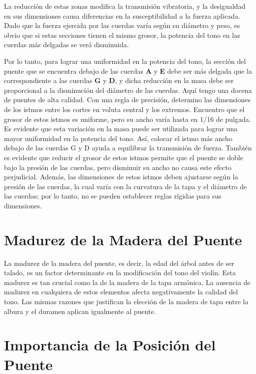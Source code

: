 \documentclass[12pt]{book}
\begin{document}
La reducción de estas zonas modifica la transmisión vibratoria, y la desigualdad en sus dimensiones causa diferencias en la susceptibilidad a la fuerza aplicada. Dado que la fuerza ejercida por las cuerdas varía según su diámetro y peso, es obvio que si estas secciones tienen el mismo grosor, la potencia del tono en las cuerdas más delgadas se verá disminuida. 

Por lo tanto, para lograr una uniformidad en la potencia del tono, la sección del puente que se encuentra debajo de las cuerdas \textbf{A} y \textbf{E} debe ser más delgada que la correspondiente a las cuerdas \textbf{G} y \textbf{D}, y dicha reducción en la masa debe ser proporcional a la disminución del diámetro de las cuerdas.
Aquí tengo una docena de puentes de alta calidad. Con una regla de precisión, determino las dimensiones de los istmos entre los cortes en voluta central y los extremos. Encuentro que el grosor de estos istmos es uniforme, pero su ancho varía hasta en 1/16 de pulgada. Es evidente que esta variación en la masa puede ser utilizada para lograr una mayor uniformidad en la potencia del tono. Así, colocar el istmo más ancho debajo de las cuerdas G y D ayuda a equilibrar la transmisión de fuerza. También es evidente que reducir el grosor de estos istmos permite que el puente se doble bajo la presión de las cuerdas, pero disminuir su ancho no causa este efecto perjudicial. Además, las dimensiones de estos istmos deben ajustarse según la presión de las cuerdas, la cual varía con la curvatura de la tapa y el diámetro de las cuerdas; por lo tanto, no se pueden establecer reglas rígidas para sus dimensiones.

\section*{Madurez de la Madera del Puente}

La madurez de la madera del puente, es decir, la edad del árbol antes de ser talado, es un factor determinante en la modificación del tono del violín. Esta madurez es tan crucial como la de la madera de la tapa armónica. La ausencia de madurez en cualquiera de estos elementos afecta negativamente la calidad del tono. Las mismas razones que justifican la elección de la madera de tapa entre la albura y el duramen aplican igualmente al puente.

\section*{Importancia de la Posición del Puente}
\end{document}
